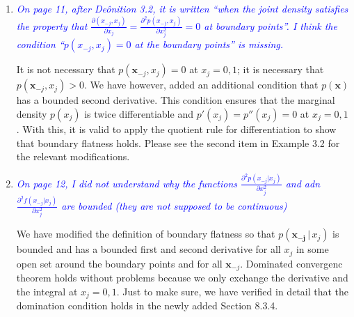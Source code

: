 \documentclass[pdftex,12pt]{article}
\def\E{{\mathbb E}}
\def\rc#1{{\it\textcolor{blue}{#1}}\smallskip}
\begin{document}
\begin{enumerate}


\item \rc{On page 11, after Deônition 3.2, it is written ``when the joint
density satisfies the property that
$\frac{\partial(x_{-j},x_j)}{\partial x_j} = \frac{\partial^2 p(x_{-j},
  x_j)}{\partial x_j^2} = 0$ at boundary points''.
I think the condition ``$p(x_{−j}, x_j ) = 0$ at the boundary points'' is
missing.}

It is not necessary that $p(\mathbf{x}_{-j}, x_j) = 0$ at $x_j = 0,1$; it is necessary that $p(\mathbf{x}_{-j}, x_j) > 0$. We have however, added an additional condition that $p(\mathbf{x})$ has a bounded second derivative. This condition ensures that the marginal density $p(x_j)$ is twice differentiable and $p'(x_j) = p''(x_j) = 0$ at $x_j = 0,1$. With this, it is valid to apply the quotient rule for differentiation to show that boundary flatness holds. Please see the second item in Example 3.2 for the relevant modifications. 


\item \rc{On page 12, I did not understand why the functions 
$\frac{\partial^2 p(x_{-j} |  x_j)}{\partial x_j^2}$
and adn 
$\frac{\partial^2 f(x_{-j} |  x_j)}{\partial x_j^2}$
are bounded (they are not supposed to be continuous)}


We have modified the definition of boundary flatness so that $p(\mathbf{x_{-j}} \,|\, x_j)$ is bounded and has a bounded first and second derivative for all $x_j$ in some open set around the boundary points and for all $\mathbf{x}_{-j}$. Dominated convergenc theorem holds without problems because we only exchange the derivative and the integral at $x_j = 0,1$. Just to make sure, we have verified in detail that the domination condition holds in the newly added Section 8.3.4.





\end{enumerate}
\end{document}
